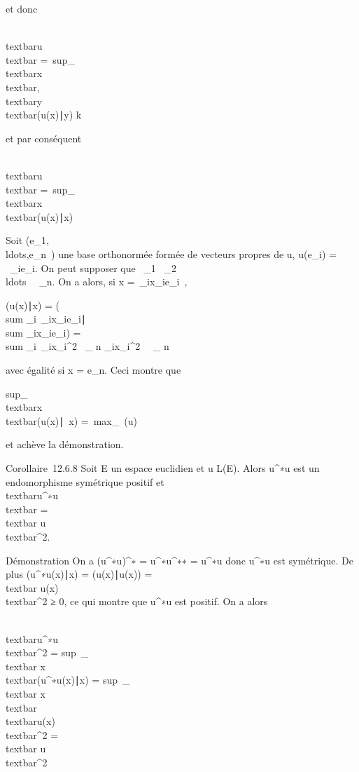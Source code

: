 \documentclass[]{article}
\begin{document}
et donc

\\textbar{}u\\textbar{}
=\
sup\_\\textbar{}x\\textbar{},\\textbar{}y\\textbar{}\textbar{}(u(x)∣y)\textbar{}\leq
k

et par conséquent

\\textbar{}u\\textbar{}
=\
sup\_\\textbar{}x\\textbar{}(u(x)∣x)

Soit
(e\_1,\\ldots,e\_n~)
une base orthonormée formée de vecteurs propres de u, u(e\_i) =
\lambda~\_ie\_i. On peut supposer que \lambda~\_1 \leq
\lambda~\_2
\leq\\ldots~ \leq
\lambda~\_n. On a alors, si x =\
\sum  \_ix\_ie\_i~,

(u(x)∣x) = (\\sum
\_i\lambda~\_ix\_ie\_i∣\\sum
\_ix\_ie\_i) = \\sum
\_i\lambda~\_ix\_i^2 \leq \lambda~\_ n
\sum \_ix\_i^2 \leq \lambda~~\_
n

avec égalité si x = e\_n. Ceci montre que

sup\_\\textbar{}x\\textbar{}(u(x)\mathrel∣~x)
=\
max\_\lambda~\in\mathrm{Sp}(u)~\lambda~

et achève la démonstration.

Corollaire~12.6.8 Soit E un espace euclidien et u \in L(E). Alors
u^∗u est un endomorphisme symétrique positif et
\\textbar{}u^∗u\\textbar{}
=\\textbar{} u\\textbar{}^2.

Démonstration On a (u^∗u)^∗ =
u^∗u^∗∗ = u^∗u donc u^∗u est
symétrique. De plus (u^∗u(x)∣x) =
(u(x)∣u(x)) =\\textbar{}
u(x)\\textbar{}^2 ≥ 0, ce qui montre que
u^∗u est positif. On a alors

\\textbar{}u^∗u\\textbar{}^2
= sup~\_\\textbar{}
x\\textbar{}(u^∗u(x)∣x)
= sup~\_\\textbar{}
x\\textbar{}\leq1\\textbar{}u(x)\\textbar{}^2
=\\textbar{} u\\textbar{}^2
\end{document}
